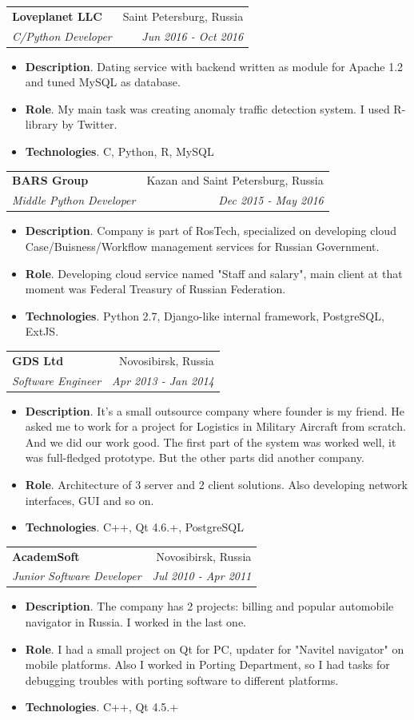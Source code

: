 \documentclass[letterpaper,11pt]{article}
\makeatletter
\newcommand{\resumeItem}[2]{
  \item\small{
    \textbf{#1}{. #2 \vspace{-2pt}}
  }
}
\newcommand{\resumeSubheading}[4]{
  \vspace{-1pt}\item
    \begin{tabular*}{0.97\textwidth}{l@{\extracolsep{\fill}}r}
      \textbf{#1} & #2 \\
      \textit{\small#3} & \textit{\small #4} \\
    \end{tabular*}\vspace{-5pt}
}
\newcommand{\resumeItemListStart}{\begin{itemize}}
\newcommand{\resumeItemListEnd}{\end{itemize}\vspace{-5pt}}
\makeatother
\begin{document}
     \resumeSubheading
       {Loveplanet LLC}{Saint Petersburg, Russia}
       {C/Python Developer}{Jun 2016 - Oct 2016}
       \resumeItemListStart
         \resumeItem{Description}
	   {Dating service with backend written as module for Apache 1.2 and tuned MySQL as database.}
	 \resumeItem{Role}
	   {My main task was creating anomaly traffic detection system. I used R-library by Twitter.}
	 \resumeItem{Technologies}
	   {C, Python, R, MySQL}
       \resumeItemListEnd

     \resumeSubheading
       {BARS Group}{Kazan and Saint Petersburg, Russia}
       {Middle Python Developer}{Dec 2015 - May 2016}
       \resumeItemListStart
         \resumeItem{Description}
	   {Company is part of RosTech, specialized on developing cloud Case/Buisness/Workflow management services for Russian Government.}
	 \resumeItem{Role}
	   {Developing cloud service named "Staff and salary", main client at that moment was Federal Treasury of Russian Federation.}
	 \resumeItem{Technologies}
	   {Python 2.7, Django-like internal framework, PostgreSQL, ExtJS.}
       \resumeItemListEnd

     \resumeSubheading
       {GDS Ltd}{Novosibirsk, Russia}
       {Software Engineer}{Apr 2013 - Jan 2014}
       \resumeItemListStart
         \resumeItem{Description}
	   {It's a small outsource company where founder is my friend. He asked me to work for a project for Logistics in Military Aircraft from scratch. And we did our work good. The first part of the system was worked well, it was full-fledged prototype. But the other parts did another company.}
	 \resumeItem{Role}
	   {Architecture of 3 server and 2 client solutions. Also developing network interfaces, GUI and so on.}
	 \resumeItem{Technologies}
	   {C++, Qt 4.6.+, PostgreSQL}
       \resumeItemListEnd

     \resumeSubheading
       {AcademSoft}{Novosibirsk, Russia}
       {Junior Software Developer}{Jul 2010 - Apr 2011}
       \resumeItemListStart
         \resumeItem{Description}
	   {The company has 2 projects: billing and popular automobile navigator in Russia. I worked in the last one.}
	 \resumeItem{Role}
	   {I had a small project on Qt for PC, updater for "Navitel navigator" on mobile platforms. Also I worked in Porting Department, so I had tasks for debugging troubles with porting software to different platforms.}
	 \resumeItem{Technologies}
	   {C++, Qt 4.5.+}
       \resumeItemListEnd
\end{document}
